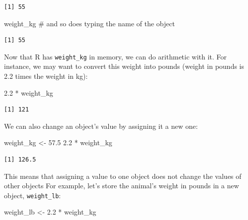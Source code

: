 \documentclass[
  letterpaper,
  DIV=11,
  numbers=noendperiod,
  oneside]{scrreprt}
\newenvironment{Shaded}{\begin{snugshade}}{\end{snugshade}}
\newcommand{\CommentTok}[1]{\textcolor[rgb]{0.37,0.37,0.37}{#1}}
\newcommand{\FloatTok}[1]{\textcolor[rgb]{0.68,0.00,0.00}{#1}}
\newcommand{\NormalTok}[1]{\textcolor[rgb]{0.00,0.23,0.31}{#1}}
\newcommand{\OtherTok}[1]{\textcolor[rgb]{0.00,0.23,0.31}{#1}}
\newcommand{\SpecialCharTok}[1]{\textcolor[rgb]{0.37,0.37,0.37}{#1}}
\begin{document}
\begin{verbatim}
[1] 55
\end{verbatim}

\begin{Shaded}
\begin{Highlighting}[]
\NormalTok{weight\_kg          }\CommentTok{\# and so does typing the name of the object}
\end{Highlighting}
\end{Shaded}

\begin{verbatim}
[1] 55
\end{verbatim}

Now that R has \texttt{weight\_kg} in memory, we can do arithmetic with
it. For instance, we may want to convert this weight into pounds (weight
in pounds is 2.2 times the weight in kg):

\begin{Shaded}
\begin{Highlighting}[]
\FloatTok{2.2} \SpecialCharTok{*}\NormalTok{ weight\_kg}
\end{Highlighting}
\end{Shaded}

\begin{verbatim}
[1] 121
\end{verbatim}

We can also change an object's value by assigning it a new one:

\begin{Shaded}
\begin{Highlighting}[]
\NormalTok{weight\_kg }\OtherTok{\textless{}{-}} \FloatTok{57.5}
\FloatTok{2.2} \SpecialCharTok{*}\NormalTok{ weight\_kg}
\end{Highlighting}
\end{Shaded}

\begin{verbatim}
[1] 126.5
\end{verbatim}

This means that assigning a value to one object does not change the
values of other objects For example, let's store the animal's weight in
pounds in a new object, \texttt{weight\_lb}:

\begin{Shaded}
\begin{Highlighting}[]
\NormalTok{weight\_lb }\OtherTok{\textless{}{-}} \FloatTok{2.2} \SpecialCharTok{*}\NormalTok{ weight\_kg}
\end{Highlighting}
\end{Shaded}
\end{document}
